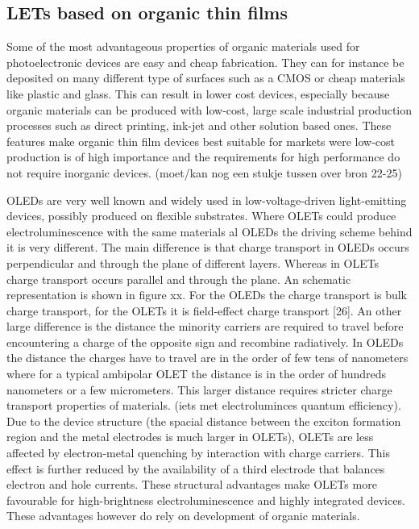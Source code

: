 \subsection{LETs based on organic thin films} %
Some of the most advantageous properties of organic materials used for photoelectronic devices are easy and cheap fabrication. They can for instance be deposited on many different type of surfaces such as a CMOS or cheap materials like plastic and glass. This can result in lower cost devices, especially because organic materials can be produced with low-cost, large scale industrial production processes such as direct printing, ink-jet and other solution based ones. These features make organic thin film devices best suitable for markets were low-cost production is of high importance and the requirements for high performance do not require inorganic devices. (moet/kan nog een stukje tussen over bron 22-25)

OLEDs are very well known and widely used in low-voltage-driven light-emitting devices, possibly produced on flexible substrates. Where OLETs could produce electroluminescence with the same materials al OLEDs the driving scheme behind it is very different. The main difference is that charge transport in OLEDs occurs perpendicular and through the plane of different layers. Whereas in OLETs charge transport occurs parallel and through the plane. An schematic representation is shown in figure xx. For the OLEDs the charge transport is bulk charge transport, for the OLETs it is field-effect charge transport [26]. An other large difference is the distance the minority carriers are required to travel before encountering a charge of the opposite sign and recombine radiatively. In OLEDs the distance the charges have to travel are in the order of few tens of nanometers where for a typical ambipolar OLET the distance is in the order of hundreds nanometers or a few micrometers. This larger distance requires stricter charge transport properties of materials. (iets met electroluminces quantum efficiency). Due to the device structure (the spacial distance between the exciton formation region and the metal electrodes is much larger in OLETs), OLETs are less affected by electron-metal quenching by interaction with charge carriers. This effect is further reduced by the availability of a third electrode that balances electron and hole currents. These structural advantages make OLETs more favourable for high-brightness electroluminescence and highly integrated devices. These advantages however do rely on development of organic materials.

